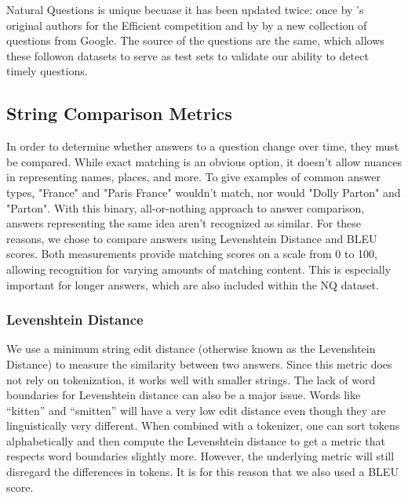 \documentclass{article}
\begin{document}
Natural Questions is unique becuase it has been updated twice: once by
's original authors for the Efficient  competition and
by  by a new collection of questions from Google.  The source
of the questions are the same, which allows these followon datasets to
serve as test sets to validate our ability to detect timely questions.


\subsection{String Comparison Metrics}
\label{string methods}


In order to determine whether answers to a question change over time, they must
be compared. While exact matching is an obvious option, it doesn't allow nuances
in representing names, places, and more. To give examples of common answer
types, "France" and "Paris France" wouldn't match, nor would "Dolly Parton" and
"Parton". With this binary, all-or-nothing approach to answer comparison,
answers representing the same idea aren’t recognized as similar. For these
reasons, we chose to compare answers using Levenshtein Distance and BLEU scores.
Both measurements provide matching scores on a scale from 0 to 100, allowing
recognition for varying amounts of matching content. This is especially
important for longer answers, which are also included within the NQ dataset.

\subsubsection{Levenshtein Distance}
\label{fuzzy}

We use a minimum string edit distance (otherwise known as the Levenshtein
Distance) to measure the similarity between two answers. Since this metric does
not rely on tokenization, it works well with smaller strings. The lack of word
boundaries for Levenshtein distance can also be a major issue. Words like
“kitten” and “smitten” will have a very low edit distance even though they are
linguistically very different. When combined with a tokenizer, one can sort
tokens alphabetically and then compute the Levenshtein distance to get a metric
that respects word boundaries slightly more. However, the underlying metric will
still disregard the differences in tokens. It is for this reason that we also
used a BLEU score.
\end{document}
